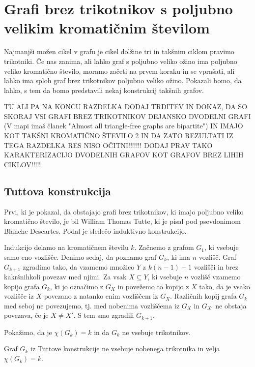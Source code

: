 \documentclass[mat1, tisk]{fmfdelo}
\begin{document}
\section{Grafi brez trikotnikov s poljubno velikim kromatičnim številom}
Najmanjši možen cikel v grafu je cikel dolžine tri in takšnim ciklom pravimo trikotniki. Če nas zanima, ali lahko graf s poljubno veliko
ožino ima poljubno veliko kromatično število, moramo začeti na prvem koraku in se vprašati, ali lahko ima sploh graf brez trikotnikov
poljubno veliko ožino. Pokazali bomo, da lahko, s tem da bomo predstavili nekaj konstrukcij takšnih grafov.

TU ALI PA NA KONCU RAZDELKA DODAJ TRDITEV IN DOKAZ, DA SO SKORAJ VSI GRAFI BREZ TRIKOTNIKOV DEJANSKO DVODELNI GRAFI (V mapi imaš članek
"Almost all triangle-free graphs are bipartite") IN IMAJO KOT TAKŠNI KROMATIČNO ŠTEVILO 2 IN DA ZATO REZULTATI IZ TEGA RAZDELKA RES NISO 
OČITNI!!!!!!! DODAJ PRAV TAKO KARAKTERIZACIJO DVODELNIH GRAFOV KOT GRAFOV BREZ LIHIH CIKLOV!!!!!

\subsection{Tuttova konstrukcija}
Prvi, ki je pokazal, da obstajajo grafi brez trikotnikov, ki imajo poljubno veliko kromatično število, je bil William Thomas Tutte, ki je
pisal pod psevdonimom Blanche Descartes. Podal je sledečo induktivno konstrukcijo.

Indukcijo delamo na kromatičnem številu $k$. Začnemo z grafom $G_1$, ki vsebuje samo eno vozlišče. Denimo sedaj, da poznamo graf $G_k$, 
ki ima $n$ vozlišč. Graf $G_{k+1}$ zgradimo tako, da vzamemo množico $Y$ z $k(n - 1) + 1$ vozlišči in brez kakršnihkoli povezav med njimi. 
Za vsak $X \subseteq Y$, ki vsebuje $n$ vozlišč vzamemo kopijo grafa $G_k$, ki jo označimo z $G_X$ in povežemo to kopijo z $X$ tako, da je 
vsako vozlišče iz $X$ povezano z natanko enim vozliščem iz $G_X$. Različnih kopij grafa $G_k$ med seboj ne povezujemo, tj. med nobenima 
vozliščema iz $G_X$ in $G_{X'}$ ne obstaja povezava, če je $X \neq X'$. S tem smo zgradili $G_{k+1}$.

Pokažimo, da je $\chi(G_k) = k$ in da $G_k$ ne vsebuje trikotnikov.

    \begin{trditev}
        Graf $G_k$ iz Tuttove konstrukcije ne vsebuje nobenega trikotnika in velja $\chi(G_k) = k$.
    \end{trditev}
    
\end{document}
